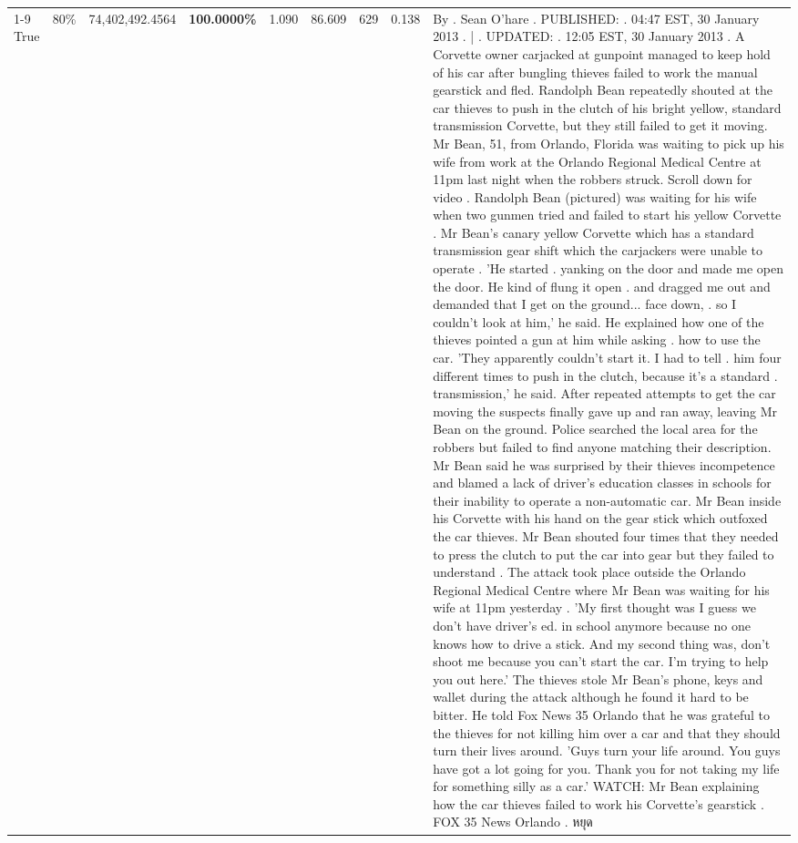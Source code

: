 \begin{table}[H]
\begin{tabular}{lllrlllll}
\cline{1-9} \cline{2-9}
True & 80\% & 74,402,492.4564 & \bfseries \color{red} 100.0000\% & 1.090 & 86.609 & 629 & 0.138 & By . Sean O'hare . PUBLISHED: . 04:47 EST, 30 January 2013 . | . UPDATED: . 12:05 EST, 30 January 2013 . A Corvette owner carjacked at gunpoint managed to keep hold of his car after bungling thieves failed to work the manual gearstick and fled. Randolph Bean repeatedly shouted at the car thieves to push in the clutch of his bright yellow, standard transmission Corvette, but they still failed to get it moving. Mr Bean, 51, from Orlando, Florida was waiting to pick up his wife from work at the Orlando Regional Medical Centre at 11pm last night when the robbers struck. Scroll down for video . Randolph Bean (pictured) was waiting for his wife when two gunmen tried and failed to start his yellow Corvette . Mr Bean's canary yellow Corvette which has a standard transmission gear shift which the carjackers were unable to operate . 'He started . yanking on the door and made me open the door. He kind of flung it open . and dragged me out and demanded that I get on the ground... face down, . so I couldn't look at him,' he said. He explained how one of the thieves pointed a gun at him while asking . how to use the car. 'They apparently couldn't start it. I had to tell . him four different times to push in the clutch, because it's a standard . transmission,' he said. After repeated attempts to get the car moving the suspects finally gave up and ran away, leaving Mr Bean on the ground. Police searched the local area for the robbers but failed to find anyone matching their description. Mr Bean said he was surprised by their thieves incompetence and blamed a lack of driver's education classes in schools for their inability to operate a non-automatic car. Mr Bean inside his Corvette with his hand on the gear stick which outfoxed the car thieves. Mr Bean shouted four times that they needed to press the clutch to put the car into gear but they failed to understand . The attack took place outside the Orlando Regional Medical Centre where Mr Bean was waiting for his wife at 11pm yesterday . 'My first thought was I guess we don't have driver's ed. in school anymore because no one knows how to drive a stick. And my second thing was, don't shoot me because you can't start the car. I'm trying to help you out here.' The thieves stole Mr Bean's phone, keys and wallet during the attack although he found it hard to be bitter. He told Fox News 35 Orlando that he was grateful to the thieves for not killing him over a car and that they should turn their lives around. 'Guys turn your life around. You guys have got a lot going for you. Thank you for not taking my life for something silly as a car.' WATCH: Mr Bean explaining how the car thieves failed to work his Corvette's gearstick . FOX 35 News Orlando . หยุด \\

\end{tabular}
\end{table}
